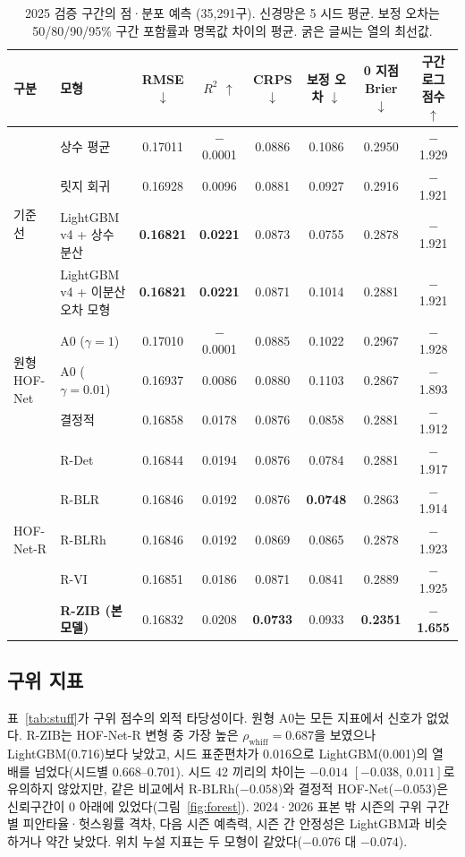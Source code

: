 \documentclass[journal,a4paper,10pt]{IEEEtran}
\begin{document}
\begin{table}[!t]
\centering
\caption{2025 검증 구간의 점·분포 예측 (35,291구). 신경망은 5 시드 평균. 보정 오차는 50/80/90/95\% 구간 포함률과 명목값 차이의 평균. 굵은 글씨는 열의 최선값.}
\label{tab:point}
\footnotesize
\begin{tabular}{@{}llcccccc@{}}
\toprule
구분 & 모형 & RMSE $\downarrow$ & $R^2$ $\uparrow$ & CRPS $\downarrow$ & 보정 오차 $\downarrow$ & 0 지점 Brier $\downarrow$ & 구간 로그 점수 $\uparrow$ \\
\midrule
\multirow{4}{*}{기준선} & 상수 평균 & 0.17011 & $-$0.0001 & 0.0886 & 0.1086 & 0.2950 & $-$1.929 \\
 & 릿지 회귀 & 0.16928 & 0.0096 & 0.0881 & 0.0927 & 0.2916 & $-$1.921 \\
 & LightGBM v4 + 상수 분산 & \textbf{0.16821} & \textbf{0.0221} & 0.0873 & 0.0755 & 0.2878 & $-$1.921 \\
 & LightGBM v4 + 이분산 오차 모형 & \textbf{0.16821} & \textbf{0.0221} & 0.0871 & 0.1014 & 0.2881 & $-$1.921 \\
\midrule
\multirow{3}{*}{원형 HOF-Net} & A0 ($\gamma=1$) & 0.17010 & $-$0.0001 & 0.0885 & 0.1022 & 0.2967 & $-$1.928 \\
 & A0 ($\gamma=0.01$) & 0.16937 & 0.0086 & 0.0880 & 0.1103 & 0.2867 & $-$1.893 \\
 & 결정적 & 0.16858 & 0.0178 & 0.0876 & 0.0858 & 0.2881 & $-$1.912 \\
\midrule
\multirow{5}{*}{HOF-Net-R} & R-Det & 0.16844 & 0.0194 & 0.0876 & 0.0784 & 0.2881 & $-$1.917 \\
 & R-BLR & 0.16846 & 0.0192 & 0.0876 & \textbf{0.0748} & 0.2863 & $-$1.914 \\
 & R-BLRh & 0.16846 & 0.0192 & 0.0869 & 0.0865 & 0.2878 & $-$1.923 \\
 & R-VI & 0.16851 & 0.0186 & 0.0871 & 0.0841 & 0.2889 & $-$1.925 \\
 & \textbf{R-ZIB (본 모델)} & 0.16832 & 0.0208 & \textbf{0.0733} & 0.0933 & \textbf{0.2351} & \textbf{$-$1.655} \\
\bottomrule
\end{tabular}
\end{table}

\subsection{구위 지표}
표~\ref{tab:stuff}가 구위 점수의 외적 타당성이다. 원형 A0는 모든 지표에서 신호가 없었다. R-ZIB는 HOF-Net-R 변형 중 가장 높은 $\rho_{\mathrm{whiff}}=0.687$을 보였으나 LightGBM(0.716)보다 낮았고, 시드 표준편차가 0.016으로 LightGBM(0.001)의 열 배를 넘었다(시드별 0.668–0.701). 시드 42 끼리의 차이는 $-0.014$ $[-0.038,\,0.011]$로 유의하지 않았지만, 같은 비교에서 R-BLRh($-0.058$)와 결정적 HOF-Net($-0.053$)은 신뢰구간이 0 아래에 있었다(그림~\ref{fig:forest}). 2024·2026 표본 밖 시즌의 구위 구간별 피안타율·헛스윙률 격차, 다음 시즌 예측력, 시즌 간 안정성은 LightGBM과 비슷하거나 약간 낮았다. 위치 누설 지표는 두 모형이 같았다($-0.076$ 대 $-0.074$).
\end{document}
